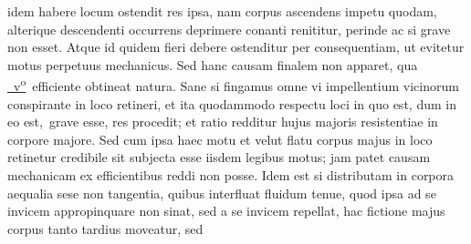 idem habere locum ostendit res ipsa, nam corpus
ascendens impetu quodam, alterique descendenti occurrens 
deprimere conanti renititur, perinde ac si grave non esset. Atque id quidem fieri debere ostenditur per 
consequentiam, ut evitetur motus perpetuus mechanicus.
Sed hanc causam finalem non apparet, qua
\href{\Scan{LH_37_05_183v}}%
{~v\textsuperscript{o}\rbrack}\ efficiente obtineat 
%
%
natura.
\pend
\pstart
Sane%
si fingamus omne 
vi impellentium vicinorum conspirante in loco retineri, et ita quodammodo 
respectu loci in quo est, dum in eo est\lbrack,\rbrack\ grave esse, res procedit; 
et ratio redditur hujus majoris resistentiae 
in corpore majore. Sed cum ipsa haec 
motu et velut flatu corpus majus in loco retinetur credibile sit subjecta esse iisdem legibus motus;
jam patet causam mechanicam ex efficientibus reddi non posse. 
\pend
\pstart
Idem est si 
distributam in corpora aequalia sese non tangentia, quibus 
interfluat fluidum tenue, quod ipsa ad se invicem appropinquare non sinat, 
sed a se invicem repellat, hac fictione 
majus corpus tanto tardius moveatur, sed 
